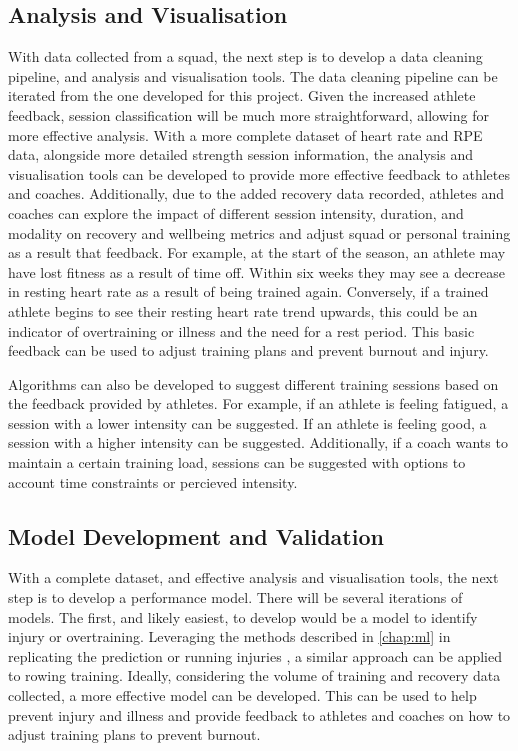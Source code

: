 \subsection{Analysis and Visualisation}
With data collected from a squad, the next step is to develop a data cleaning pipeline, and analysis and visualisation tools. The data cleaning pipeline can be iterated from the one developed for this project. Given the increased athlete feedback, session classification will be much more straightforward, allowing for more effective analysis. With a more complete dataset of heart rate and RPE data, alongside more detailed strength session information, the analysis and visualisation tools can be developed to provide more effective feedback to athletes and coaches. Additionally, due to the added recovery data recorded, athletes and coaches can explore the impact of different session intensity, duration, and modality on recovery and wellbeing metrics and adjust squad or personal training as a result that feedback. For example, at the start of the season, an athlete may have lost fitness as a result of time off. Within six weeks they may see a decrease in resting heart rate as a result of being trained again. Conversely, if a trained athlete begins to see their resting heart rate trend upwards, this could be an indicator of overtraining or illness and the need for a rest period. This basic feedback can be used to adjust training plans and prevent burnout and injury.

Algorithms can also be developed to suggest different training sessions based on the feedback provided by athletes. For example, if an athlete is feeling fatigued, a session with a lower intensity can be suggested. If an athlete is feeling good, a session with a higher intensity can be suggested. Additionally, if a coach wants to maintain a certain training load, sessions can be suggested with options to account time constraints or percieved intensity.

\subsection{Model Development and Validation}
With a complete dataset, and effective analysis and visualisation tools, the next step is to develop a performance model. There will be several iterations of models. The first, and likely easiest, to develop would be a model to identify injury or overtraining. Leveraging the methods described in \autoref{chap:ml} in replicating the prediction or running injuries \cite{Lovdal2021}, a similar approach can be applied to rowing training. Ideally, considering the volume of training and recovery data collected, a more effective model can be developed. This can be used to help prevent injury and illness and provide feedback to athletes and coaches on how to adjust training plans to prevent burnout.

